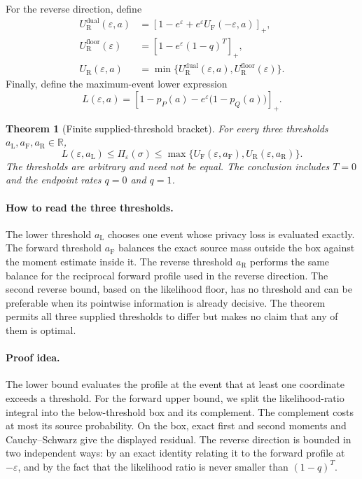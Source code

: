 \documentclass[11pt]{article}
\newtheorem{theorem}{Theorem}[section]
\theoremstyle{remark}
\newcommand{\R}{\mathbb R}
\newcommand{\pos}[1]{\left[#1\right]_{+}}
\begin{document}
For the reverse direction, define
\begin{align}
  U_{\mathrm R}^{\mathrm{dual}}(\varepsilon,a)
    &=\pos{1-e^\varepsilon
        +e^\varepsilon U_{\mathrm F}(-\varepsilon,a)},\label{eq:reverse-dual}\\
  U_{\mathrm R}^{\mathrm{floor}}(\varepsilon)
    &=\pos{1-e^\varepsilon(1-q)^T},\label{eq:reverse-floor}\\
  U_{\mathrm R}(\varepsilon,a)
    &=\min\bigl\{U_{\mathrm R}^{\mathrm{dual}}(\varepsilon,a),
                  U_{\mathrm R}^{\mathrm{floor}}(\varepsilon)\bigr\}.
\end{align}
Finally, define the maximum-event lower expression
\begin{equation}\label{eq:lower-expression}
  L(\varepsilon,a)
  =\pos{1-p_P(a)-e^\varepsilon\bigl(1-p_Q(a)\bigr)}.
\end{equation}

\begin{theorem}[Finite supplied-threshold bracket]\label{thm:finite-bracket}
For every three thresholds $a_{\mathrm L},a_{\mathrm F},a_{\mathrm R}\in\R$,
\begin{equation}\label{eq:main-bracket}
  L(\varepsilon,a_{\mathrm L})
  \leq \Pi_\varepsilon(\sigma)
  \leq
  \max\bigl\{
    U_{\mathrm F}(\varepsilon,a_{\mathrm F}),
    U_{\mathrm R}(\varepsilon,a_{\mathrm R})
  \bigr\}.
\end{equation}
The thresholds are arbitrary and need not be equal.  The conclusion includes
$T=0$ and the endpoint rates $q=0$ and $q=1$.
\end{theorem}

\paragraph{How to read the three thresholds.}
The lower threshold $a_{\mathrm L}$ chooses one event whose privacy loss is
evaluated exactly.  The forward threshold $a_{\mathrm F}$ balances the exact
source mass outside the box against the moment estimate inside it.  The
reverse threshold $a_{\mathrm R}$ performs the same balance for the
reciprocal forward profile used in the reverse direction.  The second reverse
bound, based on the likelihood floor, has no threshold and can be preferable
when its pointwise information is already decisive.  The theorem permits all
three supplied thresholds to differ but makes no claim that any of them is
optimal.

\paragraph{Proof idea.}
The lower bound evaluates the profile at the event that at least one
coordinate exceeds a threshold.  For the forward upper bound, we split the
likelihood-ratio integral into the below-threshold box and its complement.
The complement costs at most its source probability.  On the box, exact
first and second moments and Cauchy--Schwarz give the displayed residual.
The reverse direction is bounded in two independent ways: by an exact
identity relating it to the forward profile at $-\varepsilon$, and by the
fact that the likelihood ratio is never smaller than $(1-q)^T$.
\end{document}
